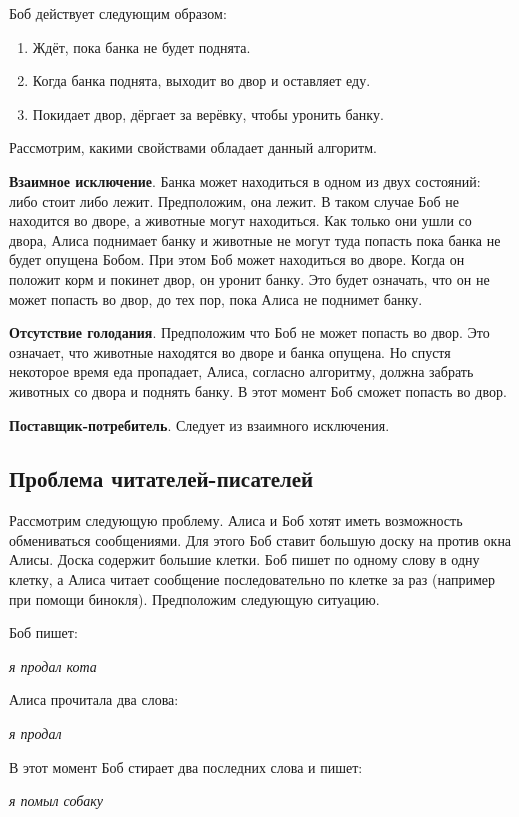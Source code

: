 Боб действует следующим образом:
\begin{enumerate}
    \item Ждёт, пока банка не будет поднята.
    \item Когда банка поднята, выходит во двор и оставляет еду.
    \item Покидает двор, дёргает за верёвку, чтобы уронить банку.
\end{enumerate}

Рассмотрим, какими свойствами обладает данный алгоритм.

\textbf{Взаимное исключение}. Банка может находиться в одном из двух состояний:
либо стоит либо лежит. Предположим, она лежит. В таком случае Боб не находится
во дворе, а животные могут находиться. Как только они ушли со двора, Алиса
поднимает банку и животные не могут туда попасть пока банка не будет опущена
Бобом. При этом Боб может находиться во дворе. Когда он положит корм и покинет
двор, он уронит банку. Это будет означать, что он не может попасть во двор, до
тех пор, пока Алиса не поднимет банку.

\textbf{Отсутствие голодания}. Предположим что Боб не может попасть во двор.
Это означает, что животные находятся во дворе и банка опущена. Но спустя
некоторое время еда пропадает, Алиса, согласно алгоритму, должна забрать
животных со двора и поднять банку. В этот момент Боб сможет попасть во двор.

\textbf{Поставщик-потребитель}. Следует из взаимного исключения.

\subsection{Проблема читателей-писателей}

Рассмотрим следующую проблему. Алиса и Боб хотят иметь возможность обмениваться
сообщениями. Для этого Боб ставит большую доску на против окна Алисы. Доска
содержит большие клетки. Боб пишет по одному слову в одну клетку, а Алиса читает
сообщение последовательно по клетке за раз (например при помощи бинокля).
Предположим следующую ситуацию. 

Боб пишет:

\textit{я продал кота}

Алиса прочитала два слова:

\textit{я продал}

В этот момент Боб стирает два последних слова и пишет:

\textit{я помыл собаку}

